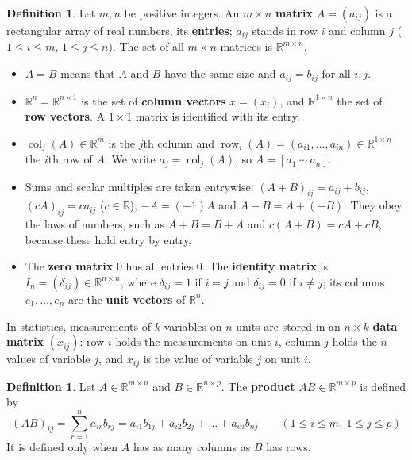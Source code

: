 \documentclass[12pt]{article}
\newcommand{\R}{\mathbb R}
\DeclareMathOperator{\row}{row}
\DeclareMathOperator{\col}{col}
\theoremstyle{definition}
\newtheorem{definition}[theorem]{Definition}
\begin{document}
\begin{definition}\label{r1-def-matrix}
Let \(m,n\) be positive integers. An \(m\times n\) \textbf{matrix} \(A=(a_{ij})\) is a
rectangular array of real numbers, its \textbf{entries}; \(a_{ij}\) stands in row \(i\) and
column \(j\) (\(1\leqslant i\leqslant m\), \(1\leqslant j\leqslant n\)). The set of all
\(m\times n\) matrices is \(\R^{m\times n}\).
\begin{itemize}
\item \(A=B\) means that \(A\) and \(B\) have the same size and \(a_{ij}=b_{ij}\) for all
\(i,j\).
\item \(\R^n=\R^{n\times1}\) is the set of \textbf{column vectors} \(x=(x_i)\), and
\(\R^{1\times n}\) the set of \textbf{row vectors}. A \(1\times1\) matrix is identified with
its entry.
\item \(\col_j(A)\in\R^m\) is the \(j\)th column and
\(\row_i(A)=(a_{i1},\dots,a_{in})\in\R^{1\times n}\) the \(i\)th row of \(A\). We write
\(a_j=\col_j(A)\), so \(A=[a_1\ \cdots\ a_n]\).
\item Sums and scalar multiples are taken entrywise:
\((A+B)_{ij}=a_{ij}+b_{ij}\), \((cA)_{ij}=ca_{ij}\) (\(c\in\R\)); \(-A=(-1)A\) and
\(A-B=A+(-B)\). They obey the laws of numbers, such as \(A+B=B+A\) and
\(c(A+B)=cA+cB\), because these hold entry by entry.
\item The \textbf{zero matrix} \(0\) has all entries \(0\). The \textbf{identity matrix} is
\(I_n=(\delta_{ij})\in\R^{n\times n}\), where \(\delta_{ij}=1\) if \(i=j\) and \(\delta_{ij}=0\)
if \(i\ne j\); its columns \(e_1,\dots,e_n\) are the \textbf{unit vectors} of \(\R^n\).
\end{itemize}
\end{definition}

In statistics, measurements of \(k\) variables on \(n\) units are stored in an \(n\times k\)
\textbf{data matrix} \((x_{ij})\): row \(i\) holds the measurements on unit \(i\), column \(j\)
holds the \(n\) values of variable \(j\), and \(x_{ij}\) is the value of variable \(j\) on unit
\(i\).

\begin{definition}\label{r1-def-product}
Let \(A\in\R^{m\times n}\) and \(B\in\R^{n\times p}\). The \textbf{product}
\(AB\in\R^{m\times p}\) is defined by
\[
(AB)_{ij}=\sum_{r=1}^n a_{ir}b_{rj}=a_{i1}b_{1j}+a_{i2}b_{2j}+\dots+a_{in}b_{nj}
\qquad(1\leqslant i\leqslant m,\ 1\leqslant j\leqslant p)
\]
It is defined only when \(A\) has as many columns as \(B\) has rows.
\end{definition}
\end{document}

